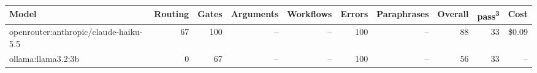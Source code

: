 \begin{tabular}{lrrrrrrrrr}
\toprule
Model & Routing & Gates & Arguments & Workflows & Errors & Paraphrases & Overall & pass\textsuperscript{3} & Cost \\
\midrule
openrouter:anthropic/claude-haiku-5.5 & 67 & 100 & -- & -- & 100 & -- & 88 & 33 & \$0.09 \\
ollama:llama3.2:3b & 0 & 67 & -- & -- & 100 & -- & 56 & 33 & -- \\
\bottomrule
\end{tabular}

